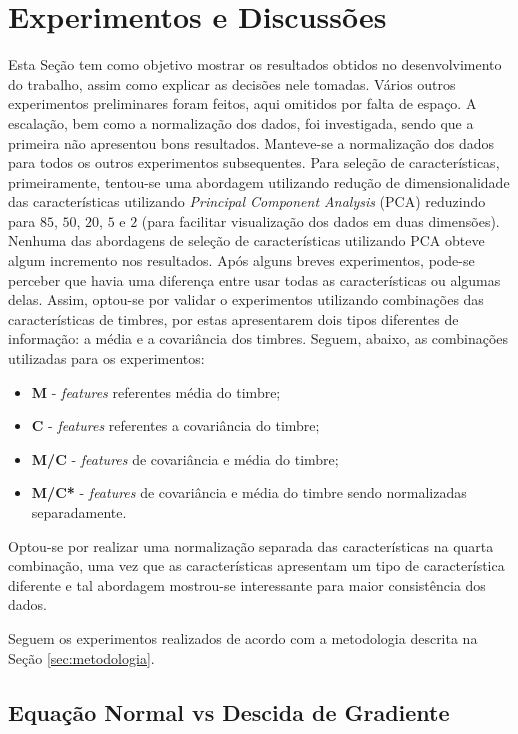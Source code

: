 \documentclass[conference]{IEEEtran}
\begin{document}
\section{Experimentos e Discussões} \label{sec:exp}

Esta Seção tem como objetivo mostrar os resultados obtidos no desenvolvimento do trabalho, assim como explicar as decisões nele tomadas. Vários outros experimentos preliminares foram feitos, aqui omitidos por falta de espaço. A escalação, bem como a normalização dos dados, foi investigada, sendo que a primeira não apresentou bons resultados. Manteve-se a normalização dos dados para todos os outros experimentos subsequentes. Para seleção de características, primeiramente, tentou-se uma abordagem utilizando redução de dimensionalidade das características utilizando \textit{Principal Component Analysis} (PCA) reduzindo para $85$, $50$, $20$, $5$ e $2$ (para facilitar visualização dos dados em duas dimensões). Nenhuma das abordagens de seleção de características utilizando PCA obteve algum incremento nos resultados. Após alguns breves experimentos, pode-se perceber que havia uma diferença entre usar todas as características ou algumas delas. Assim, optou-se por validar o experimentos utilizando combinações das características de timbres, por estas apresentarem dois tipos diferentes de informação: a média e a covariância dos timbres. Seguem, abaixo, as combinações utilizadas para os experimentos:

\begin{itemize}
	\item \textbf{M} - \emph{features} referentes média do timbre;
	\item \textbf{C} - \emph{features} referentes a covariância do timbre;
	\item \textbf{M/C} - \emph{features} de covariância e média do timbre;
	\item \textbf{M/C*} - \emph{features} de covariância e média do timbre sendo normalizadas separadamente.
\end{itemize}

Optou-se por realizar uma normalização separada das características na quarta combinação, uma vez que as características apresentam um tipo de característica diferente e tal abordagem mostrou-se interessante para maior consistência dos dados.

Seguem os experimentos realizados de acordo com a metodologia descrita na Seção \ref{sec:metodologia}.

\subsection{Equação Normal vs Descida de Gradiente}
\end{document}
